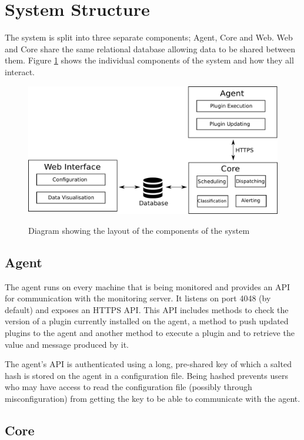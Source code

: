 \documentclass[bsc,deptreport,twoside,parskip,singlespacing,notimes]{infthesis}
\begin{document}
\section{System Structure}

	The system is split into three separate components; Agent, Core and Web. Web
	and Core share the same relational database allowing data to be shared
	between them.  Figure \ref{system_structure} shows the individual components of
	the system and how they all interact.

\begin{figure}[H]
	\caption{Diagram showing the layout of the components of the system}
	\includegraphics[scale=0.5]{assets/system_structure.pdf}
	\label{system_structure}
\end{figure}

\subsection{Agent}

	The agent runs on every machine that is being monitored and provides an API for
	communication with the monitoring server.  It listens on port 4048 (by default)
	and exposes an HTTPS API.  This API includes methods to check the version of a
	plugin currently installed on the agent, a method to push updated plugins to
	the agent and another method to execute a plugin and to retrieve the value and
	message produced by it.


	The agent's API is authenticated using a long, pre-shared key of which a salted
	hash is stored on the agent in a configuration file.  Being hashed prevents
	users who may have access to read the configuration file (possibly through
	misconfiguration) from getting the key to be able to communicate with the
	agent.

\subsection{Core}
\end{document}
